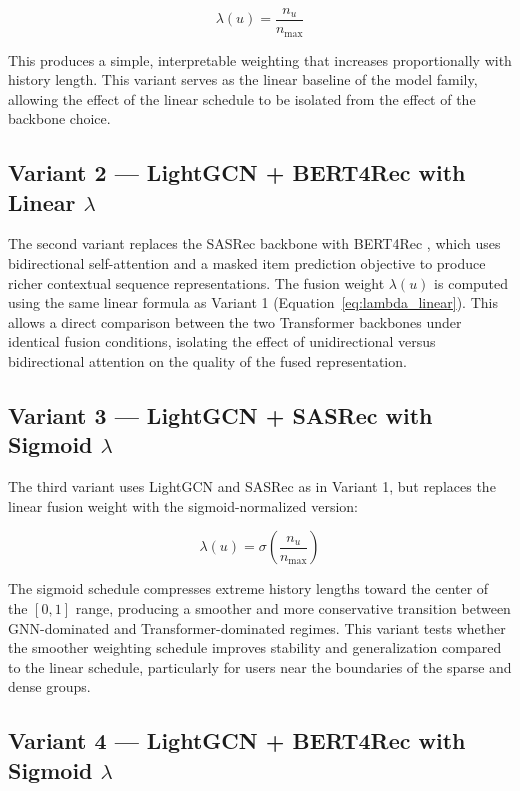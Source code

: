 \documentclass[12pt,a4paper]{report}
\begin{document}
\begin{equation}
    \lambda(u) = \frac{n_u}{n_{\max}}
    \label{eq:lambda_linear}
\end{equation}

\noindent This produces a simple, interpretable weighting that increases
proportionally with history length. This variant serves as the linear baseline
of the model family, allowing the effect of the linear schedule to be isolated
from the effect of the backbone choice.

\subsection{Variant 2 — LightGCN + BERT4Rec with Linear \(\lambda\)}

The second variant replaces the SASRec backbone with BERT4Rec
\citep{sun2019bert4rec}, which uses bidirectional self-attention and a masked
item prediction objective to produce richer contextual sequence
representations. The fusion weight \(\lambda(u)\) is computed using the same
linear formula as Variant 1 (Equation~\ref{eq:lambda_linear}). This allows a
direct comparison between the two Transformer backbones under identical fusion
conditions, isolating the effect of unidirectional versus bidirectional
attention on the quality of the fused representation.

\subsection{Variant 3 — LightGCN + SASRec with Sigmoid \(\lambda\)}

The third variant uses LightGCN and SASRec as in Variant 1, but replaces the
linear fusion weight with the sigmoid-normalized version:

\begin{equation}
    \lambda(u) = \sigma\!\left(\frac{n_u}{n_{\max}}\right)
    \label{eq:lambda_sigmoid}
\end{equation}

\noindent The sigmoid schedule compresses extreme history lengths toward the
center of the \([0,1]\) range, producing a smoother and more conservative
transition between GNN-dominated and Transformer-dominated regimes. This
variant tests whether the smoother weighting schedule improves stability and
generalization compared to the linear schedule, particularly for users near
the boundaries of the sparse and dense groups.

\subsection{Variant 4 — LightGCN + BERT4Rec with Sigmoid \(\lambda\)}
\end{document}
